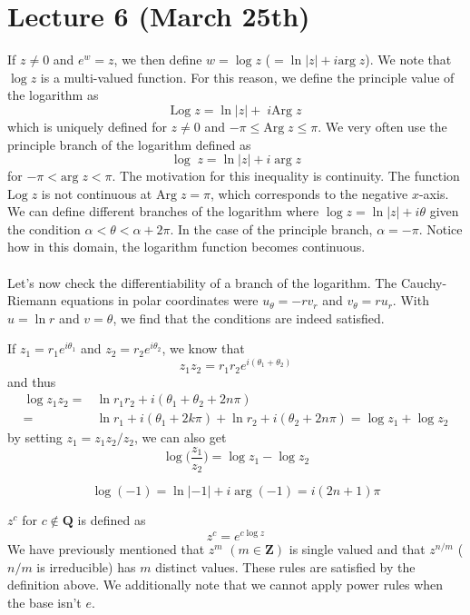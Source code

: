 \section{Lecture 6 (March 25th)}
\begin{defi}
If $z\ne 0$ and $e^{w}=z$, we then define $w=\log z$ ($=\ln|z|+i\mathrm{arg}\;z$). We note that $\log z$ is a multi-valued function. For this reason, we define the principle value of the logarithm as
\[\mathrm{Log}\;z=\ln|z|+\;i\mathrm{Arg}\;z\]
which is uniquely defined for $z\ne 0$ and $-\pi \leq\mathrm{Arg}\;z\leq \pi$. We very often use the principle branch of the logarithm defined as
\[\log\;z=\ln|z|+i\;\mathrm{arg}\;z\]
for $-\pi<\mathrm{arg}\;z<\pi$. The motivation for this inequality is continuity. The function $\mathrm{Log}\; z$ is not continuous at $\mathrm{Arg}\;z=\pi$, which corresponds to the negative $x$-axis. We can define different branches of the logarithm where $\log z=\ln |z|+i\theta $ given the condition $\alpha <\theta <\alpha +2\pi$. In the case of the principle branch, $\alpha =-\pi $. Notice how in this domain, the logarithm function becomes continuous. 
\\\\
Let's now check the differentiability of a  branch of the logarithm. The Cauchy-Riemann equations in polar coordinates were $u_{\theta }=-rv_{r}$ and $v_{\theta }=ru_{r}$. With $u=\ln r$ and $v=\theta $, we find that the conditions are indeed satisfied.
\end{defi}
\vspace{2ex}
\begin{rmk}
If $z_1=r_1e^{i\theta_1}$ and $z_2=r_2e^{i\theta_2}$, we know that
\[z_1z_2=r_1r_2e^{i(\theta_1+\theta_2)}\]
and thus
\begin{align*}
	\log z_1z_2=&\ln r_1r_2+i(\theta_1+\theta_2+2n\pi)\\
	=&\ln r_1+i(\theta_1+2k\pi)+\ln r_2+i(\theta_2+2n\pi)=\log z_1+\log z_2
\end{align*}
by setting $z_1=z_1z_2/z_2$, we can also get
\[\log \Big(\dfrac{z_1}{z_2}\Big)=\log z_1-\log z_2\]
\end{rmk}
\vspace{2ex}
\begin{ex}
\[\log (-1)=\ln |-1|+i\;\mathrm{arg}\;(-1)=i(2n+1)\pi\]
\end{ex}
\vspace{2ex}
\begin{recall}
$z^{c}$ for $c\notin {\bm Q}$ is defined as\[z^{c}=e^{c\log z}\]
We have previously mentioned that $z^{m}$ $(m\in {\bm Z})$ is single valued and that $z^{n/m}$ ($n/m$ is irreducible) has $m$ distinct values. These rules are satisfied by the definition above. We additionally note that we cannot apply power rules when the base isn't $e$. 
\end{recall}

